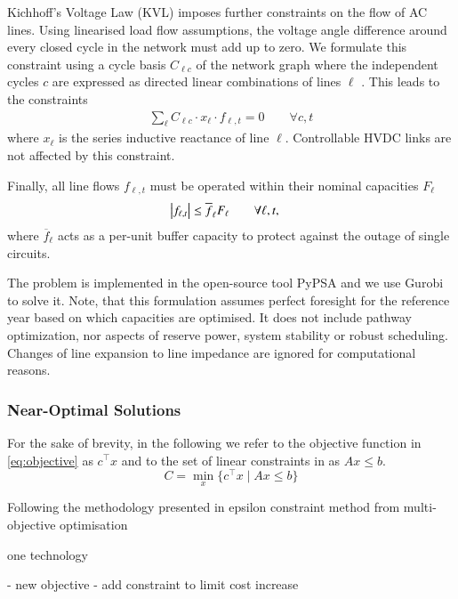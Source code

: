 Kichhoff's Voltage Law (KVL) imposes further constraints on the flow of AC lines.
Using linearised load flow assumptions, the voltage angle difference around every closed cycle in the
network must add up to zero. We formulate this constraint using a cycle basis $C_{\ell c}$
of the network graph where the independent cycles $c$ are expressed as
directed linear combinations of lines $\ell$ \cite{cycleflows}.
This leads to the constraints
\begin{align}
    \sum_\ell C_{\ell c} \cdot x_\ell \cdot f_{\ell,t} = 0 \qquad\forall c,t
\end{align}
where $x_\ell$ is the series inductive reactance of line $\ell$.
Controllable HVDC links are not affected by this constraint.

Finally, all line flows $f_{\ell,t}$ must be operated within their nominal capacities $F_\ell$
\begin{align}
    \left|f_{\ell,t}\right| \leq \overline{f}_{\ell} F_{\ell} & \qquad\forall \ell, t,
    \label{eq:lastA}
\end{align}
where $\overline{f}_\ell$ acts as a per-unit buffer capacity
to protect against the outage of single circuits.

The problem is implemented in the open-source tool PyPSA \cite{pypsa} and we use Gurobi to solve it.
Note, that this formulation assumes perfect foresight for the reference year based on which capacities are optimised.
It does not include pathway optimization, nor aspects of reserve power, system stability or robust scheduling.
Changes of line expansion to line impedance are ignored for computational reasons.

\subsubsection{Near-Optimal Solutions}

For the sake of brevity, in the following we refer
to the objective function in \cref{eq:objective} as $c^\top x$ and
to the set of linear constraints in  as $Ax\leq b$.
\begin{equation}
    C = \min_x\{c^\top x \mid Ax\leq b\}
\end{equation}

Following the methodology presented in \cite{nearoptimal}
epsilon constraint method from multi-objective optimisation \cite{mavrotas_effective_2009}

one technology

- new objective
- add constraint to limit cost increase

